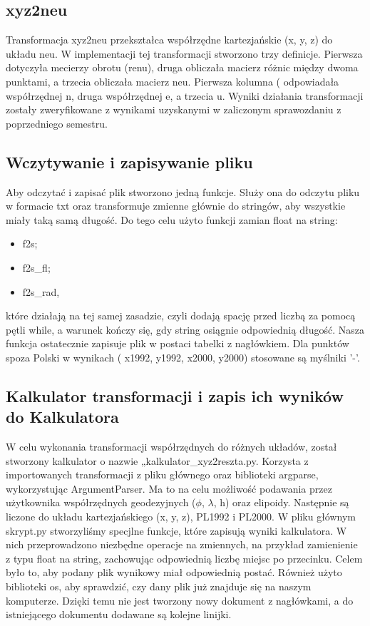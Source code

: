 \documentclass[10pt,a4paper]{article}
\begin{document}
	
	\subsection{xyz2neu} 
	Transformacja xyz2neu przekształca współrzędne kartezjańskie (x, y, z) do układu neu. W implementacji tej transformacji stworzono trzy definicje. Pierwsza dotyczyła mecierzy obrotu (renu), druga obliczała macierz różnic między dwoma punktami, a trzecia obliczała macierz neu. Pierwsza kolumna ( odpowiadała współrzędnej n, druga współrzędnej e, a trzecia u. Wyniki działania transformacji zostały zweryfikowane z wynikami uzyskanymi w zaliczonym sprawozdaniu z poprzedniego semestru. 
	\newpage
	\subsection{Wczytywanie i zapisywanie pliku}
	Aby odczytać i zapisać plik stworzono jedną funkcje. Służy ona do odczytu pliku w formacie txt oraz transformuje zmienne głównie do stringów, aby wszystkie miały taką samą długość. Do tego celu użyto funkcji zamian float na string: 

	\begin{itemize}
		\item f2s;
		\item f2s\_{}fl;
		\item f2s\_{}rad,

	\end{itemize}
	które działają na tej samej zasadzie, czyli dodają spację przed liczbą za pomocą pętli while, a warunek kończy się, gdy string osiągnie odpowiednią długość. Nasza funkcja ostatecznie zapisuje plik w postaci tabelki z nagłówkiem. Dla punktów spoza Polski w wynikach ( x1992, y1992, x2000, y2000) stosowane są myślniki '-'.

	\subsection{Kalkulator transformacji i zapis ich wyników do Kalkulatora}
	W celu wykonania transformacji współrzędnych do różnych układów, został stworzony kalkulator o nazwie „kalkulator\_{}xyz2reszta.py. Korzysta z importowanych transformacji z pliku głównego oraz biblioteki argparse, wykorzystując ArgumentParser.
	Ma to na celu możliwość podawania przez użytkownika współrzędnych geodezyjnych ($\phi$, $\lambda$, h) oraz elipoidy. Następnie są liczone do układu kartezjańskiego (x, y, z), PL1992 i PL2000.
	\newline
	W pliku głównym skrypt.py stworzyliśmy specjlne funkcje, które zapisują wyniki kalkulatora. 
	W nich przeprowadzono niezbędne operacje na zmiennych, na przykład zamienienie z typu float na string, zachowując odpowiednią liczbę miejsc po przecinku. Celem było to, aby podany plik wynikowy miał odpowiednią postać. Również użyto biblioteki os, aby sprawdzić, czy dany plik już znajduje się na naszym komputerze. Dzięki temu nie jest tworzony nowy dokument z nagłówkami, a do istniejącego dokumentu dodawane są kolejne linijki.
	
\end{document}
